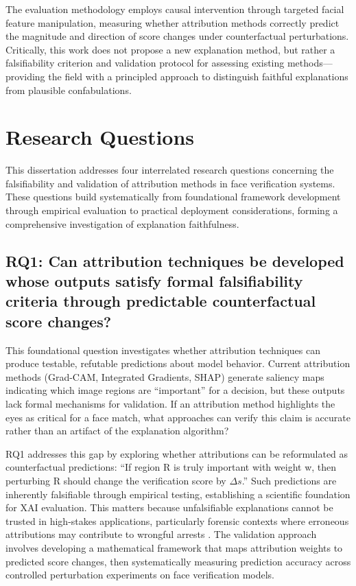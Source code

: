 The evaluation methodology employs causal intervention through targeted facial feature manipulation, measuring whether attribution methods correctly predict the magnitude and direction of score changes under counterfactual perturbations. Critically, this work does not propose a new explanation method, but rather a falsifiability criterion and validation protocol for assessing existing methods---providing the field with a principled approach to distinguish faithful explanations from plausible confabulations.

\section{Research Questions}
\label{sec:research_questions}

This dissertation addresses four interrelated research questions concerning the falsifiability and validation of attribution methods in face verification systems. These questions build systematically from foundational framework development through empirical evaluation to practical deployment considerations, forming a comprehensive investigation of explanation faithfulness.

\subsection*{RQ1: Can attribution techniques be developed whose outputs satisfy formal falsifiability criteria through predictable counterfactual score changes?}

This foundational question investigates whether attribution techniques can produce testable, refutable predictions about model behavior. Current attribution methods (Grad-CAM, Integrated Gradients, SHAP) \cite{selvaraju2019gradcam,Sundararajan2017_IG,lundberg2017unified} generate saliency maps indicating which image regions are ``important'' for a decision, but these outputs lack formal mechanisms for validation. If an attribution method highlights the eyes as critical for a face match, what approaches can verify this claim is accurate rather than an artifact of the explanation algorithm?

RQ1 addresses this gap by exploring whether attributions can be reformulated as counterfactual predictions: ``If region R is truly important with weight w, then perturbing R should change the verification score by $\Delta s$.'' Such predictions are inherently falsifiable through empirical testing, establishing a scientific foundation for XAI evaluation. This matters because unfalsifiable explanations cannot be trusted in high-stakes applications, particularly forensic contexts where erroneous attributions may contribute to wrongful arrests \cite{nrc2009strengthening,hill2020detroit}. The validation approach involves developing a mathematical framework that maps attribution weights to predicted score changes, then systematically measuring prediction accuracy across controlled perturbation experiments on face verification models.

